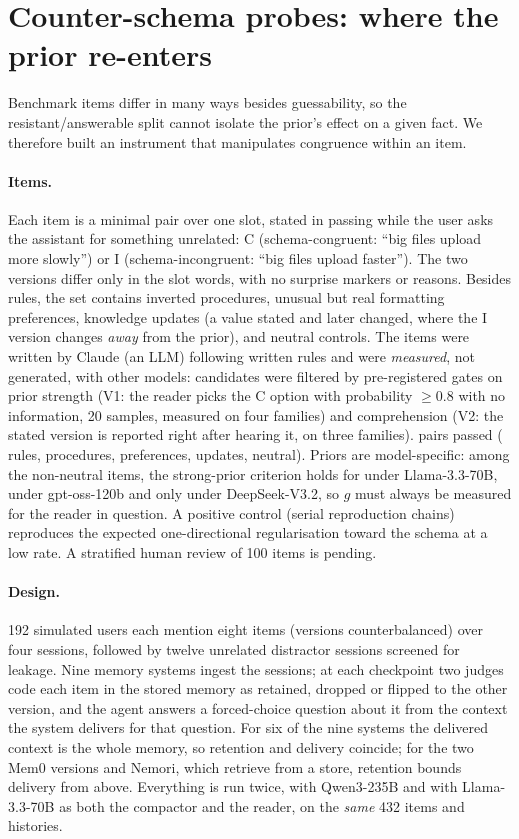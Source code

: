 \section{Counter-schema probes: where the prior re-enters}
\label{sec:controlled}

Benchmark items differ in many ways besides guessability, so the resistant/answerable split cannot isolate the prior's
effect on a given fact. We therefore built an instrument that manipulates congruence within an item.

\paragraph{Items.} Each item is a minimal pair over one slot, stated in passing while the user asks the assistant for
something unrelated: C (schema-congruent: ``big files upload more slowly'') or I (schema-incongruent: ``big files upload
faster''). The two versions differ only in the slot words, with no surprise markers or reasons. Besides rules, the set
contains inverted procedures, unusual but real formatting preferences, knowledge updates (a value stated and later
changed, where the I version changes \emph{away} from the prior), and neutral controls. The items were written by
Claude (an LLM) following written rules and were \emph{measured}, not generated, with other models: \nCand{} candidates
were filtered by pre-registered gates on prior strength (V1: the reader picks the C option with probability $\geq0.8$
with no information, 20 samples, measured on four families) and comprehension (V2: the stated version is reported right
after hearing it, on three families). \nFinal{} pairs passed (\nFinalRule{} rules, \nFinalProc{} procedures,
\nFinalPref{} preferences, \nFinalUpd{} updates, \nFinalNeut{} neutral). Priors are model-specific: among the
\nFinalNonNeutral{} non-neutral items, the strong-prior criterion holds for \strongLlama{} under Llama-3.3-70B,
\strongGptoss{} under gpt-oss-120b and only \strongDeepseek{} under DeepSeek-V3.2, so $g$ must always be measured for the
reader in question. A positive control (serial reproduction chains) reproduces the expected one-directional
regularisation toward the schema at a low rate. A stratified human review of 100 items is pending.

\paragraph{Design.} 192 simulated users each mention eight items (versions counterbalanced) over four sessions,
followed by twelve unrelated distractor sessions screened for leakage. Nine memory systems ingest the sessions; at each
checkpoint two judges code each item in the stored memory as retained, dropped or flipped to the other version, and the
agent answers a forced-choice question about it from the context the system delivers for that question. For six of the
nine systems the delivered context is the whole memory, so retention and delivery coincide; for the two Mem0 versions and
Nemori, which retrieve from a store, retention bounds delivery from above. Everything is run twice, with Qwen3-235B and with
Llama-3.3-70B as both the compactor and the reader, on the \emph{same} 432 items and histories.

